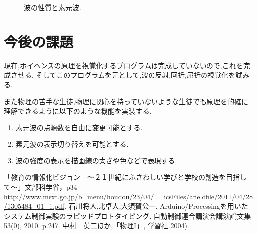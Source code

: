 \documentclass[a4j,twocolumn,uplatex]{jarticle}
\begin{document}
\begin{figure}[htbp]
\caption{{\footnotesize 波の性質と素元波.}}
\label{fig:thomson2clausius}
\end{figure}
\vspace{-7mm}

\section{今後の課題}
現在,ホイヘンスの原理を視覚化するプログラムは完成していないので,これを完成させる.
そしてこのプログラムを元として,波の反射,回折,屈折の視覚化を試みる.

また物理の苦手な生徒,物理に関心を持っていないような生徒でも原理を的確に理解できるように以下のような機能を実装する.
\begin{enumerate}
\item 素元波の点源数を自由に変更可能とする.
\item 素元波の表示切り替えを可能とする.
\item 波の強度の表示を描画線の太さや色などで表現する.
\end{enumerate}

\vspace{-5mm}
\begin{thebibliography}{9}
「教育の情報化ビジョン　〜２１世紀にふさわしい学びと学校の創造を目指して〜」文部科学省，p34 \url{http://www.mext.go.jp/b_menu/houdou/23/04/__icsFiles/afieldfile/2011/04/28/1305484_01_1.pdf}.
 石川将人,北卓人,大須賀公一. Arduino/Processingを用いたシステム制御実験のラピッドプロトタイピング. 自動制御連合講演会講演論文集 53(0), 2010. p.247.
 中村　英二ほか,「物理I」, 学習社 2004).


\end{thebibliography}
\end{document}
